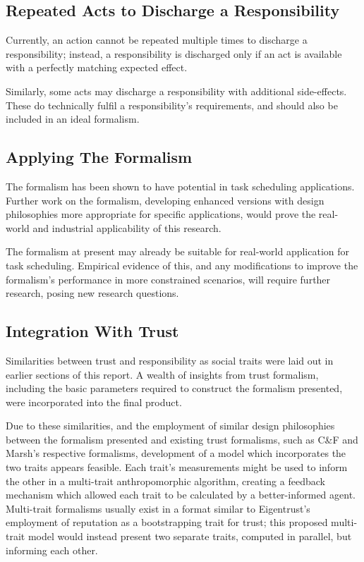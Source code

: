 \subsection{Repeated Acts to Discharge a Responsibility}
Currently, an action cannot be repeated multiple times to discharge a responsibility; instead, a responsibility is discharged only if an act is available with a perfectly matching expected effect.\par

Similarly, some acts may discharge a responsibility with additional side-effects. These do technically fulfil a responsibility's requirements, and should also be included in an ideal formalism.\par

\subsection{Applying The Formalism}
The formalism has been shown to have potential in task scheduling applications. Further work on the formalism, developing enhanced versions with design philosophies more appropriate for specific applications, would prove the real-world and industrial applicability of this research.\par

The formalism at present may already be suitable for real-world application for task scheduling. Empirical evidence of this, and any modifications to improve the formalism's performance in more constrained scenarios, will require further research, posing new research questions.\par

\subsection{Integration With Trust}
Similarities between trust and responsibility as social traits were laid out in earlier sections of this report. A wealth of insights from trust formalism, including the basic parameters required to construct the formalism presented, were incorporated into the final product.\par

Due to these similarities, and the employment of similar design philosophies between the formalism presented and existing trust formalisms, such as C\&F and Marsh's respective formalisms, development of a model which incorporates the two traits appears feasible. Each trait's measurements might be used to inform the other in a multi-trait anthropomorphic algorithm, creating a feedback mechanism which allowed each trait to be calculated by a better-informed agent. Multi-trait formalisms usually exist in a format similar to Eigentrust's employment of reputation as a bootstrapping trait for trust; this proposed multi-trait model would instead present two separate traits, computed in parallel, but informing each other.\par


